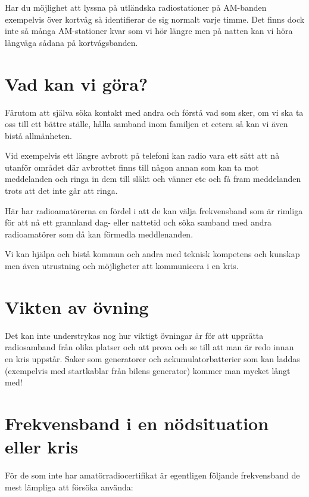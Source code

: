 Har du möjlighet att lyssna på utländska radiostationer på AM-banden
exempelvis över kortvåg så identifierar de sig normalt varje timme. Det finns
dock inte så många AM-stationer kvar som vi hör längre men på natten kan vi
höra långväga sådana på kortvågsbanden.

\section{Vad kan vi göra?}

Färutom att själva söka kontakt med andra och förstå vad som sker, om vi ska
ta oss till ett bättre ställe, hålla samband inom familjen et cetera så kan vi
även bistå allmänheten.

Vid exempelvis ett längre avbrott på telefoni kan radio vara ett sätt att nå
utanför området där avbrottet finns till någon annan som kan ta mot
meddelanden och ringa in dem till släkt och vänner etc och få fram meddelanden
trots att det inte går att ringa.

Här har radioamatörerna en fördel i att de kan välja frekvensband som är
rimliga för att nå ett grannland dag- eller nattetid och söka samband med
andra radioamatörer som då kan förmedla meddlenanden.

Vi kan hjälpa och bistå kommun och andra med teknisk kompetens och kunskap men
även utrustning och möjligheter att kommunicera i en kris.


\section{Vikten av övning}

Det kan inte understrykas nog hur viktigt övningar är för att upprätta
radiosamband från olika platser och att prova och se till att man är redo
innan en kris uppstår. Saker som generatorer och ackumulatorbatterier som kan
laddas (exempelvis med startkablar från bilens generator) kommer man mycket
långt med!

\section{Frekvensband i en nödsituation eller kris}

För de som inte har amatörradiocertifikat är egentligen följande frekvensband de mest lämpliga att försöka använda:

